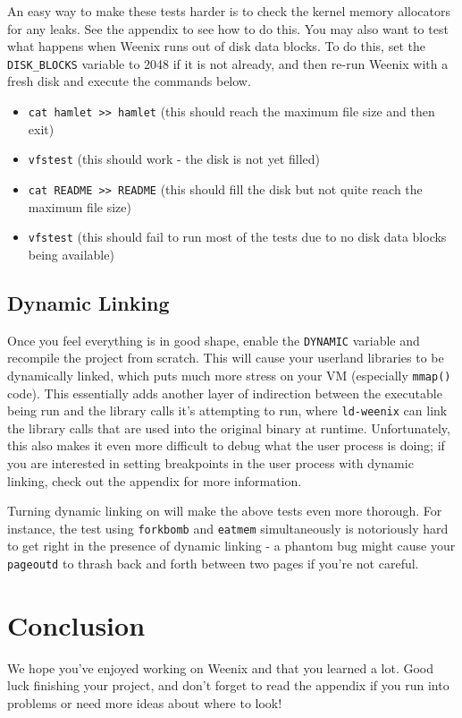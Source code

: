 An easy way to make these tests harder is to check the kernel memory allocators for any leaks. See the  appendix to see how to do this. You may also want to test what happens when Weenix runs out of disk data blocks. To do this, set the \texttt{DISK\_BLOCKS} variable to 2048 if it is not already, and then re-run Weenix with a fresh disk and execute the commands below.

\begin{itemize}
    \item \texttt{cat hamlet >> hamlet} (this should reach the maximum file size and then exit)
    \item \texttt{vfstest} (this should work - the disk is not yet filled)
    \item \texttt{cat README >> README} (this should fill the disk but not quite reach the maximum file size)
    \item \texttt{vfstest} (this should fail to run most of the tests due to no disk data blocks being available)
\end{itemize}

\subsection{Dynamic Linking}

Once you feel everything is in good shape, enable the \texttt{DYNAMIC} variable and recompile the project from scratch. This will cause your userland libraries to be dynamically linked, which puts much more stress on your VM (especially \texttt{mmap()} code). This essentially adds another layer of indirection between the executable being run and the library calls it's attempting to run, where \texttt{ld-weenix} can link the library calls that are used into the original binary at runtime. Unfortunately, this also makes it even more difficult to debug what the user process is doing; if you are interested in setting breakpoints in the user process with dynamic linking, check out the  appendix for more information.

Turning dynamic linking on will make the above tests even more thorough. For instance, the test using \texttt{forkbomb} and \texttt{eatmem} simultaneously is notoriously hard to get right in the presence of dynamic linking - a phantom bug might cause your \texttt{pageoutd} to thrash back and forth between two pages if you're not careful.

\section{Conclusion}

We hope you've enjoyed working on Weenix and that you learned a lot. Good luck finishing your project, and don't forget to read the  appendix if you run into problems or need more ideas about where to look!
